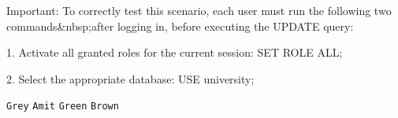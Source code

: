 \documentclass[12pt]{exam}
\begin{document}
\begin{questions}
Important: To correctly test this scenario, each user must run the following two commands&nbsp;after logging in, before executing the UPDATE query:

1. Activate all granted roles for the current session:
SET ROLE ALL;

2. Select the appropriate database:
USE university;

\begin{choices}
  \CorrectChoice \texttt{Grey}
  \CorrectChoice \texttt{Amit}
  \choice        \texttt{Green}
  \CorrectChoice \texttt{Brown}
\end{choices}





\end{questions}
\end{document}
